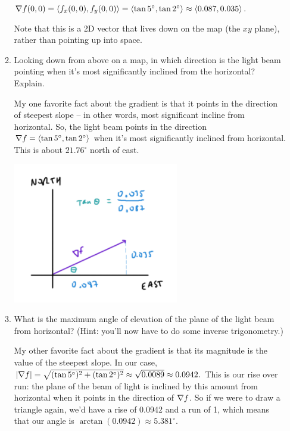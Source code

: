 \begin{enumerate}[leftmargin=0pt]
\begin{enumerate}
        \begin{red}
        $\nabla f(0, 0) = \langle f_x(0, 0), f_y(0, 0) \rangle = \langle \tan 5^\circ, \tan 2^\circ\rangle \approx \langle 0.087, 0.035\rangle$. 
        
        Note that this is a 2D vector that lives down on the map (the $xy$ plane), rather than pointing up into space.
        \end{red}
        \item Looking down from above on a map, in which direction is the light beam pointing when it's most significantly inclined from the horizontal? Explain. 
        
        \begin{red}
        My one favorite fact about the gradient is that it points in the direction of steepest slope -- in other words, most significant incline from horizontal. So, the light beam points in the direction $\nabla f = \langle \tan 5^\circ, \tan 2^\circ\rangle$ when it's most significantly inclined from horizontal. This is about $21.76^\circ$ north of east.
        
        \begin{center}
            \includegraphics[width=0.6\textwidth]{../images/map.png}
        \end{center}
        \end{red}
        
        \pagebreak
        
        \item What is the maximum angle of elevation of the plane of the light beam from horizontal? (Hint: you'll now have to do some inverse trigonometry.) 
        
        \begin{red}
        My other favorite fact about the gradient is that its magnitude is the value of the steepest slope. In our case, $|\nabla f| = \sqrt{(\tan 5^\circ)^2 + (\tan 2^\circ)^2} \approx \sqrt{0.0089} \approx 0.0942.$ This is our rise over run: the plane of the beam of light is inclined by this amount from horizontal when it points in the direction of $\nabla f$. So if we were to draw a triangle again, we'd have a rise of 0.0942 and a run of 1, which means that our angle is $\arctan(0.0942) \approx 5.381^\circ.$
        \end{red}
        

\end{enumerate}
\end{enumerate}
